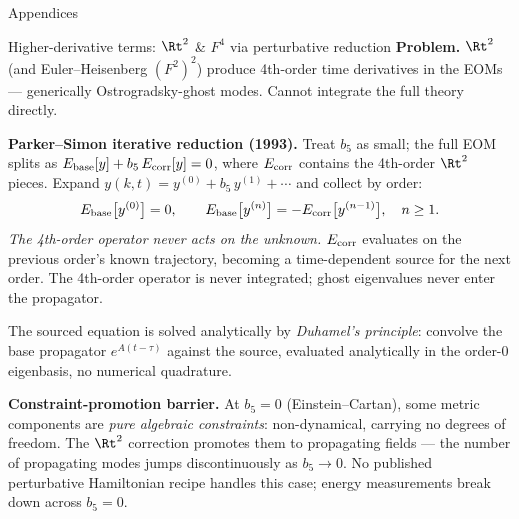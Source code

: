 
\begin{frame}[plain]
  \centering\Huge Appendices
\end{frame}

\begin{frame}{Higher-derivative terms: $\Rt^2$ \& $F^4$ via perturbative reduction}
  \scriptsize
  \textbf{Problem.} $\Rt^2$ (and Euler--Heisenberg $(F^2)^2$) produce 4th-order time
  derivatives in the EOMs --- generically Ostrogradsky-ghost modes.  Cannot integrate
  the full theory directly.

  \vspace{0.4em}
  \textbf{Parker--Simon iterative reduction (1993).}  Treat $b_5$ as small;
  the full EOM splits as $E_{\rm base}[y] + b_5\,E_{\rm corr}[y]=0$, where
  $E_{\rm corr}$ contains the 4th-order $\Rt^2$ pieces.  Expand
  $y(k,t) = y^{(0)} + b_5\,y^{(1)} + \cdots$ and collect by order:
  \[
    E_{\rm base}\bigl[y^{(0)}\bigr] = 0,\qquad
    E_{\rm base}\bigl[y^{(n)}\bigr] = -E_{\rm corr}\bigl[y^{(n-1)}\bigr],
    \quad n\ge 1.
  \]
  \emph{The 4th-order operator never acts on the unknown.}  $E_{\rm corr}$ evaluates
  on the previous order's known trajectory, becoming a time-dependent source for the
  next order.  The 4th-order operator is never integrated; ghost eigenvalues never enter the
  propagator.

  The sourced equation is solved analytically by \emph{Duhamel's principle}: convolve
  the base propagator $e^{A(t-\tau)}$ against the source, evaluated analytically in
  the order-$0$ eigenbasis, no numerical quadrature.

  \vspace{0.4em}
  \textbf{Constraint-promotion barrier.}
  At $b_5=0$ (Einstein--Cartan), some metric components are \emph{pure algebraic
  constraints}: non-dynamical, carrying no degrees of freedom.  The $\Rt^2$ correction
  promotes them to propagating fields --- the number of propagating modes
  jumps discontinuously as $b_5\to 0$. No published perturbative Hamiltonian recipe handles
  this case; energy measurements break down across $b_5=0$.
\end{frame}


